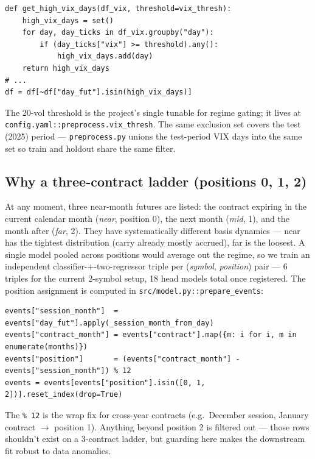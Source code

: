 \documentclass[11pt,a4paper]{article}
\begin{document}
\begin{lstlisting}[style=pystyle]
def get_high_vix_days(df_vix, threshold=vix_thresh):
    high_vix_days = set()
    for day, day_ticks in df_vix.groupby("day"):
        if (day_ticks["vix"] >= threshold).any():
            high_vix_days.add(day)
    return high_vix_days
# ...
df = df[~df["day_fut"].isin(high_vix_days)]
\end{lstlisting}

The 20-vol threshold is the project's single tunable for regime gating; it lives at \texttt{config.yaml::preprocess.vix\_thresh}. The same exclusion set covers the test (2025) period --- \texttt{preprocess.py} unions the test-period VIX days into the same set so train and holdout share the same filter.

\subsection{Why a three-contract ladder (positions 0, 1, 2)}
At any moment, three near-month futures are listed: the contract expiring in the current calendar month (\emph{near}, position 0), the next month (\emph{mid}, 1), and the month after (\emph{far}, 2). They have systematically different basis dynamics --- near has the tightest distribution (carry already mostly accrued), far is the loosest. A single model pooled across positions would average out the regime, so we train an independent classifier-+-two-regressor triple per (\emph{symbol}, \emph{position}) pair --- 6 triples for the current 2-symbol setup, 18 head models total once registered. The position assignment is computed in \texttt{src/model.py::prepare\_events}:

\begin{lstlisting}[style=pystyle]
events["session_month"]  = events["day_fut"].apply(_session_month_from_day)
events["contract_month"] = events["contract"].map({m: i for i, m in enumerate(months)})
events["position"]       = (events["contract_month"] - events["session_month"]) % 12
events = events[events["position"].isin([0, 1, 2])].reset_index(drop=True)
\end{lstlisting}

The \texttt{\% 12} is the wrap fix for cross-year contracts (e.g.~December session, January contract $\to$ position 1). Anything beyond position 2 is filtered out --- those rows shouldn't exist on a 3-contract ladder, but guarding here makes the downstream fit robust to data anomalies.

\newpage
\end{document}
